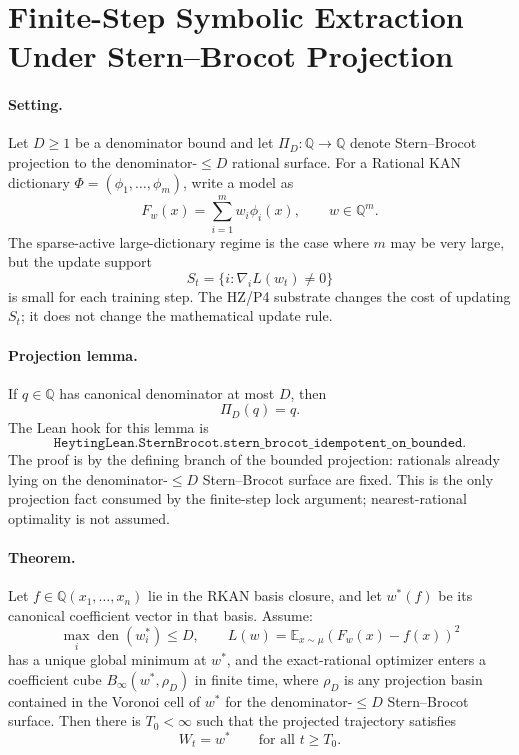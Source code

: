 \section{Finite-Step Symbolic Extraction Under Stern--Brocot Projection}

\paragraph{Setting.}
Let \(D \ge 1\) be a denominator bound and let
\(\Pi_D : \mathbb{Q} \to \mathbb{Q}\) denote Stern--Brocot projection to
the denominator-\(\le D\) rational surface.  For a Rational KAN dictionary
\(\Phi = (\phi_1,\ldots,\phi_m)\), write a model as
\[
  F_w(x) = \sum_{i=1}^{m} w_i \phi_i(x),
  \qquad w \in \mathbb{Q}^m .
\]
The sparse-active large-dictionary regime is the case where \(m\) may be very
large, but the update support
\[
  S_t = \{ i : \nabla_i L(w_t) \ne 0 \}
\]
is small for each training step.  The HZ/P4 substrate changes the cost of
updating \(S_t\); it does not change the mathematical update rule.

\paragraph{Projection lemma.}
If \(q \in \mathbb{Q}\) has canonical denominator at most \(D\), then
\[
  \Pi_D(q) = q .
\]
The Lean hook for this lemma is
\[
\texttt{HeytingLean.SternBrocot.stern\_brocot\_idempotent\_on\_bounded}.
\]
The proof is by the defining branch of the bounded projection: rationals
already lying on the denominator-\(\le D\) Stern--Brocot surface are fixed.
This is the only projection fact consumed by the finite-step lock argument;
nearest-rational optimality is not assumed.

\paragraph{Theorem.}
Let \(f \in \mathbb{Q}(x_1,\ldots,x_n)\) lie in the RKAN basis closure, and
let \(w^\ast(f)\) be its canonical coefficient vector in that basis.  Assume:
\[
  \max_i \operatorname{den}(w_i^\ast) \le D,
  \qquad
  L(w) = \mathbb{E}_{x \sim \mu} (F_w(x)-f(x))^2
\]
has a unique global minimum at \(w^\ast\), and the exact-rational optimizer
enters a coefficient cube \(B_\infty(w^\ast,\rho_D)\) in finite time, where
\(\rho_D\) is any projection basin contained in the Voronoi cell of
\(w^\ast\) for the denominator-\(\le D\) Stern--Brocot surface.  Then there is
\(T_0 < \infty\) such that the projected trajectory satisfies
\[
  W_t = w^\ast \qquad \text{for all } t \ge T_0 .
\]

